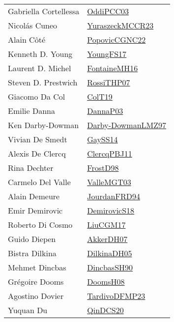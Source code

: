 {\begin{longtable}{p{4cm}p{20cm}}
Gabriella Cortellessa & \href{papers/OddiPCC03.pdf}{OddiPCC03}\cite{OddiPCC03} \\
Nicol{\'{a}}s Cuneo & \href{articles/YuraszeckMCCR23.pdf}{YuraszeckMCCR23}\cite{YuraszeckMCCR23} \\
Alain C{\^{o}}t{\'{e}} & \href{papers/PopovicCGNC22.pdf}{PopovicCGNC22}\cite{PopovicCGNC22} \\
Kenneth D. Young & \href{papers/YoungFS17.pdf}{YoungFS17}\cite{YoungFS17} \\
Laurent D. Michel & \href{papers/FontaineMH16.pdf}{FontaineMH16}\cite{FontaineMH16} \\
Steven D. Prestwich & \href{papers/RossiTHP07.pdf}{RossiTHP07}\cite{RossiTHP07} \\
Giacomo Da Col & \href{papers/ColT19.pdf}{ColT19}\cite{ColT19} \\
Emilie Danna & \href{papers/DannaP03.pdf}{DannaP03}\cite{DannaP03} \\
Ken Darby{-}Dowman & \href{articles/Darby-DowmanLMZ97.pdf}{Darby-DowmanLMZ97}\cite{Darby-DowmanLMZ97} \\
Vivian De Smedt & \href{papers/GaySS14.pdf}{GaySS14}\cite{GaySS14} \\
Alexis De Clercq & \href{papers/ClercqPBJ11.pdf}{ClercqPBJ11}\cite{ClercqPBJ11} \\
Rina Dechter & \href{papers/FrostD98.pdf}{FrostD98}\cite{FrostD98} \\
Carmelo Del Valle & \href{papers/ValleMGT03.pdf}{ValleMGT03}\cite{ValleMGT03} \\
Alain Demeure & \href{papers/JourdanFRD94.pdf}{JourdanFRD94}\cite{JourdanFRD94} \\
Emir Demirovic & \href{papers/DemirovicS18.pdf}{DemirovicS18}\cite{DemirovicS18} \\
Roberto Di Cosmo & \href{papers/LiuCGM17.pdf}{LiuCGM17}\cite{LiuCGM17} \\
Guido Diepen & \href{papers/AkkerDH07.pdf}{AkkerDH07}\cite{AkkerDH07} \\
Bistra Dilkina & \href{papers/DilkinaDH05.pdf}{DilkinaDH05}\cite{DilkinaDH05} \\
Mehmet Dincbas & \href{articles/DincbasSH90.pdf}{DincbasSH90}\cite{DincbasSH90} \\
Gr{\'{e}}goire Dooms & \href{papers/DoomsH08.pdf}{DoomsH08}\cite{DoomsH08} \\
Agostino Dovier & \href{papers/TardivoDFMP23.pdf}{TardivoDFMP23}\cite{TardivoDFMP23} \\
Yuquan Du & \href{articles/QinDCS20.pdf}{QinDCS20}\cite{QinDCS20} \\

\end{longtable}}
